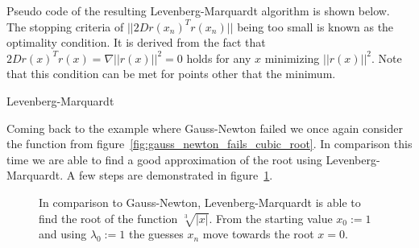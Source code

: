Pseudo code of the resulting Levenberg-Marquardt algorithm is shown below. The stopping criteria of $||2Dr(x_n)^Tr(x_n)||$ being too small is known as the optimality condition. It is derived from the fact that $2Dr(x)^Tr(x) = \nabla||r(x)||^2 = 0$ holds for any $x$ minimizing $||r(x)||^2$. Note that this condition can be met for points other that the minimum.

\begin{algorithm}[H] \label{alg:levenberg-marquardt}
	\SetAlgoLined
	\DontPrintSemicolon
	\LinesNumbered
	\caption{Levenberg-Marquardt}
	
	\BlankLine
\end{algorithm}
\vspace{1cm}

Coming back to the example where Gauss-Newton failed we once again consider the function from figure~\ref{fig:gauss_newton_fails_cubic_root}. In comparison this time we are able to find a good approximation of the root using Levenberg-Marquardt. A few steps are demonstrated in figure~\ref{fig:levenberg-marquardt-example}.

\begin{figure}[h]
	\centering
	\caption{In comparison to Gauss-Newton, Levenberg-Marquardt is able to find the root of the function $\sqrt[3]{|x|}$. From the starting value $x_0 := 1$ and using $\lambda_0 := 1$ the guesses $x_n$ move towards the root $x=0$.}
	\label{fig:levenberg-marquardt-example}
\end{figure}

